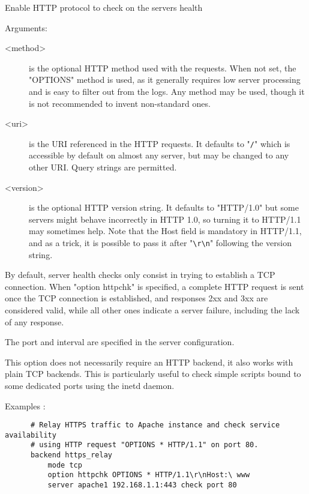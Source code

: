 
  Enable HTTP protocol to check on the servers health


  Arguments:
\begin{description}
\item[<method>]  is the optional HTTP method used with the requests. When not set,
              the "OPTIONS" method is used, as it generally requires low server
              processing and is easy to filter out from the logs. Any method
              may be used, though it is not recommended to invent non-standard
              ones.

\item[<uri>]     is the URI referenced in the HTTP requests. It defaults to "\verb|/|"
              which is accessible by default on almost any server, but may be
              changed to any other URI. Query strings are permitted.

\item[<version>] is the optional HTTP version string. It defaults to "HTTP/1.0"
              but some servers might behave incorrectly in HTTP 1.0, so turning
              it to HTTP/1.1 may sometimes help. Note that the Host field is
              mandatory in HTTP/1.1, and as a trick, it is possible to pass it
              after "\verb|\r\n|" following the version string.
\end{description}

  By default, server health checks only consist in trying to establish a TCP
  connection. When "option httpchk" is specified, a complete HTTP request is
  sent once the TCP connection is established, and responses 2xx and 3xx are
  considered valid, while all other ones indicate a server failure, including
  the lack of any response.

  The port and interval are specified in the server configuration.

  This option does not necessarily require an HTTP backend, it also works with
  plain TCP backends. This is particularly useful to check simple scripts bound
  to some dedicated ports using the inetd daemon.

  Examples :
\begin{verbatim}
      # Relay HTTPS traffic to Apache instance and check service availability
      # using HTTP request "OPTIONS * HTTP/1.1" on port 80.
      backend https_relay
          mode tcp
          option httpchk OPTIONS * HTTP/1.1\r\nHost:\ www
          server apache1 192.168.1.1:443 check port 80
\end{verbatim}


